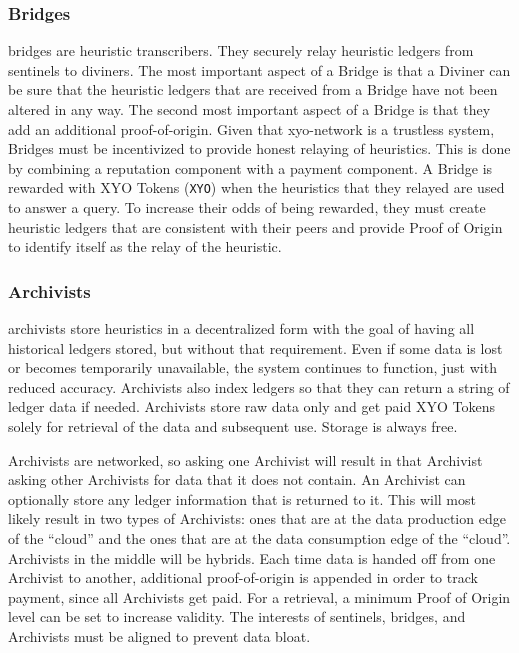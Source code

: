 \documentclass{article}
\begin{document}
\subsubsection {Bridges}
\Glspl{bridge} are \gls{heuristic} transcribers. They securely relay heuristic ledgers from \Glspl{sentinel} to \Glspl{diviner}. The most important aspect of a Bridge is that a Diviner can be sure that the heuristic ledgers that are received from a Bridge have not been altered in any way. The second most important aspect of a Bridge is that they add an additional \Gls{proof-of-origin}. Given that \Gls{xyo-network} is a trustless system, Bridges must be incentivized to provide honest relaying of heuristics. This is done by combining a reputation component with a payment component. A Bridge is rewarded with XYO Tokens (\texttt{XYO}) when the heuristics that they relayed are used to answer a query. To increase their odds of being rewarded, they must create heuristic ledgers that are consistent with their peers and provide Proof of Origin to identify itself as the relay of the heuristic.

\subsubsection {Archivists}
\Glspl{archivist} store \glspl{heuristic} in a decentralized form with the goal of having all historical ledgers stored, but without that requirement. Even if some data is lost or becomes temporarily unavailable, the system continues to function, just with reduced \gls{accuracy}. Archivists also index ledgers so that they can return a string of ledger data if needed. Archivists store raw data only and get paid XYO Tokens solely for retrieval of the data and subsequent use. Storage is always free.

Archivists are networked, so asking one Archivist will result in that Archivist asking other Archivists for data that it does not contain. An Archivist can optionally store any ledger information that is returned to it. This will most likely result in two types of Archivists: ones that are at the data production edge of the ``cloud'' and the ones that are at the data consumption edge of the ``cloud''. Archivists in the middle will be hybrids. Each time data is handed off from one Archivist to another, additional \Gls{proof-of-origin} is appended in order to track payment, since all Archivists get paid. For a retrieval, a minimum Proof of Origin level can be set to increase validity. The interests of \Glspl{sentinel}, \Glspl{bridge}, and Archivists must be aligned to prevent data bloat.
\end{document}
